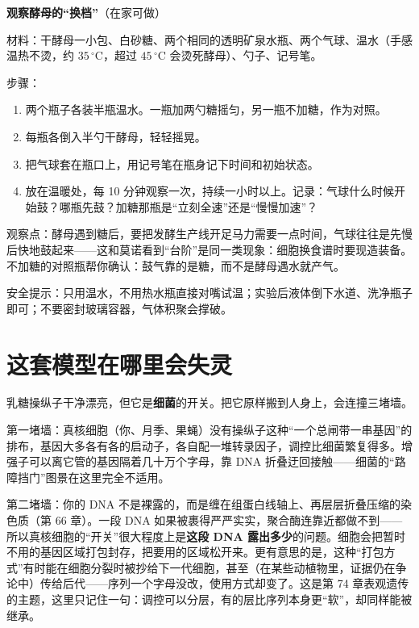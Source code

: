 \begin{shiyan}
\textbf{观察酵母的“换档”}（在家可做）

材料：干酵母一小包、白砂糖、两个相同的透明矿泉水瓶、两个气球、温水（手感温热不烫，约 $35\,^{\circ}\mathrm{C}$，超过 $45\,^{\circ}\mathrm{C}$ 会烫死酵母）、勺子、记号笔。

步骤：
\begin{enumerate}[itemsep=1pt]
\item 两个瓶子各装半瓶温水。一瓶加两勺糖摇匀，另一瓶不加糖，作为对照。
\item 每瓶各倒入半勺干酵母，轻轻摇晃。
\item 把气球套在瓶口上，用记号笔在瓶身记下时间和初始状态。
\item 放在温暖处，每 10 分钟观察一次，持续一小时以上。记录：气球什么时候开始鼓？哪瓶先鼓？加糖那瓶是“立刻全速”还是“慢慢加速”？
\end{enumerate}

观察点：酵母遇到糖后，要把发酵生产线开足马力需要一点时间，气球往往是先慢后快地鼓起来——这和莫诺看到“台阶”是同一类现象：细胞换食谱时要现造装备。不加糖的对照瓶帮你确认：鼓气靠的是糖，而不是酵母遇水就产气。

安全提示：只用温水，不用热水瓶直接对嘴试温；实验后液体倒下水道、洗净瓶子即可；不要密封玻璃容器，气体积聚会撑破。
\end{shiyan}

\section{这套模型在哪里会失灵}

乳糖操纵子干净漂亮，但它是\textbf{细菌}的开关。把它原样搬到人身上，会连撞三堵墙。

第一堵墙：真核细胞（你、月季、果蝇）没有操纵子这种“一个总闸带一串基因”的排布，基因大多各有各的启动子，各自配一堆转录因子，调控比细菌繁复得多。增强子可以离它管的基因隔着几十万个字母，靠 DNA 折叠迂回接触——细菌的“路障挡门”图景在这里完全不适用。

第二堵墙：你的 DNA 不是裸露的，而是缠在组蛋白线轴上、再层层折叠压缩的染色质（第 66 章）。一段 DNA 如果被裹得严严实实，聚合酶连靠近都做不到——所以真核细胞的“开关”很大程度上是\textbf{这段 DNA 露出多少}的问题。细胞会把暂时不用的基因区域打包封存，把要用的区域松开来。更有意思的是，这种“打包方式”有时能在细胞分裂时被抄给下一代细胞，甚至（在某些动植物里，证据仍在争论中）传给后代——序列一个字母没改，使用方式却变了。这是第 74 章表观遗传的主题，这里只记住一句：调控可以分层，有的层比序列本身更“软”，却同样能被继承。

